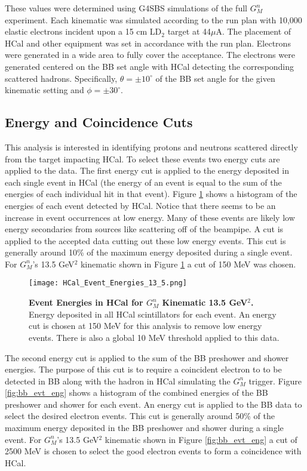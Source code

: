 \documentclass[10pt]{article}
\begin{document}
These values were determined using G4SBS simulations of the full $G_M^n$ experiment. Each kinematic was simulated according to the run plan with 10,000 elastic electrons incident upon a 15 cm LD$_2$ target at 44$\mu$A. The placement of HCal and other equipment was set in accordance with the run plan. Electrons were generated in a wide area to fully cover the acceptance. The electrons were generated centered on the BB set angle with HCal detecting the corresponding scattered hadrons. Specifically, $\theta = \pm10^{\circ}$ of the BB set angle for the given kinematic setting and $\phi = \pm30^{\circ}$.\\

\subsection{Energy and Coincidence Cuts}
\label{ssec:cuts}

This analysis is interested in identifying protons and neutrons scattered directly from the target impacting HCal. To select these events two energy cuts are applied to the data. The first energy cut is applied to the energy deposited in each single event in HCal (the energy of an event is equal to the sum of the energies of each individual hit in that event). Figure \ref{fig:hcal_evt_eng} shows a histogram of the energies of each event detected by HCal. Notice that there seems to be an increase in event occurrences at low energy. Many of these events are likely low energy secondaries from sources like scattering off of the beampipe. A cut is applied to the accepted data cutting out these low energy events. This cut is generally around 10\% of the maximum energy deposited during a single event. For $G_M^n$'s 13.5 GeV$^2$ kinematic shown in Figure \ref{fig:hcal_evt_eng} a cut of 150 MeV was chosen. \\

	\begin{figure}[!ht]
	\begin{center}
	\texttt{[image: HCal\_Event\_Energies\_13\_5.png]}
	\end{center}
	\caption{
	{\bf{Event Energies in HCal for $G_M^n$ Kinematic 13.5 GeV$^2$.}} Energy deposited in all HCal scintillators for each event. An energy cut is chosen at 150 MeV for this analysis to remove low energy events. There is also a global 10 MeV threshold applied to this data.}
	\label{fig:hcal_evt_eng}
	\end{figure}	
	
The second energy cut is applied to the sum of the BB preshower and shower energies. The purpose of this cut is to require a coincident electron to to be detected in BB along with the hadron in HCal simulating the $G_M^n$ trigger. Figure \ref{fig:bb_evt_eng} shows a histogram of the combined energies of the BB preshower and shower for each event. An energy cut is applied to the BB data to select the desired electron events. This cut is generally around 50\% of the maximum energy deposited in the BB preshower and shower during a single event. For $G_M^n$'s 13.5 GeV$^2$ kinematic shown in Figure \ref{fig:bb_evt_eng} a cut of 2500 MeV is chosen to select the good electron events to form a coincidence with HCal.\\
\end{document}
